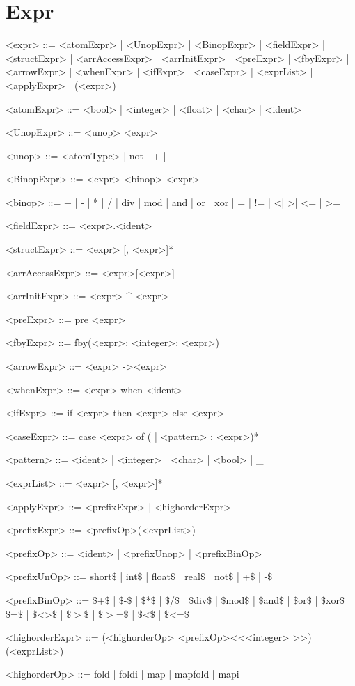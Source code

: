 \documentclass{article}
\begin{document}
\section{Expr}
\begin{grammar}

<expr> ::= <atomExpr> | <UnopExpr> | <BinopExpr> | <fieldExpr> | <structExpr> |
           <arrAccessExpr> | <arrInitExpr> | <preExpr> | <fbyExpr> | <arrowExpr> |
           <whenExpr> | <ifExpr> | <caseExpr> | <exprList> | <applyExpr> | (<expr>)

<atomExpr> ::= <bool> | <integer> | <float> | <char> | <ident>

<UnopExpr> ::= <unop> <expr>

<unop> ::= <atomType> | not | + | -

<BinopExpr> ::= <expr> <binop> <expr>

<binop> ::= + | - | * | / | div | mod | and | or | xor | = | != | \textless | \textgreater | \textless= | \textgreater=

<fieldExpr> ::= <expr>.<ident>

<structExpr> ::= {<expr> [, <expr>]*}

<arrAccessExpr> ::= <expr>[<expr>]

<arrInitExpr> ::= <expr> \^{} <expr>

<preExpr> ::= pre <expr>

<fbyExpr> ::= fby(<expr>; <integer>; <expr>)

<arrowExpr> ::= <expr> -\textgreater <expr>

<whenExpr> ::= <expr> when <ident>

<ifExpr> ::= if <expr> then <expr> else <expr>

<caseExpr> ::= case <expr> of ( | <pattern> : <expr>)*

<pattern> ::= <ident> | <integer> | <char> | <bool> | _

<exprList> ::= <expr> [, <expr>]*

<applyExpr> ::= <prefixExpr> | <highorderExpr>

<prefixExpr> ::= <prefixOp>(<exprList>)

<prefixOp> ::= <ident> | <prefixUnop> | <prefixBinOp>

<prefixUnOp> ::= short\(\$\) | int\(\$\) | float\(\$\) | real\(\$\) | not\(\$\) | +\(\$\) | -\(\$\)

<prefixBinOp> ::= \(\$\)+\(\$\) | \(\$\)-\(\$\) | \(\$\)*\(\$\) | \(\$\)/\(\$\) |
                  \(\$\)div\(\$\) | \(\$\)mod\(\$\) | \(\$\)and\(\$\) | \(\$\)or\(\$\) | \(\$\)xor\(\$\) |
                  \(\$\)=\(\$\) | \(\$\)<>\(\$\) | \(\$\)\(>\)\(\$\) | \(\$\)\(>\)=\(\$\) | \(\$\)\textless\(\$\) | \(\$\)\textless=\(\$\)

<highorderExpr> ::= (<highorderOp> <prefixOp>\textless \textless <integer> \textgreater \textgreater)(<exprList>)

<highorderOp> ::= fold | foldi | map | mapfold | mapi





\end{grammar}
\end{document}
